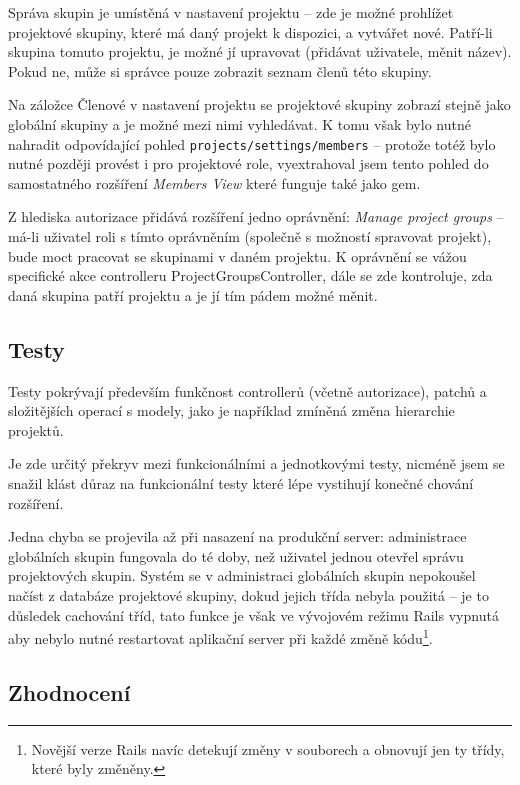 \documentclass[thesis=B,czech]{FITthesis}[2012/05/02]
\begin{document}
Správa skupin je umístěná v nastavení projektu -- zde je možné prohlížet
projektové skupiny, které má daný projekt k dispozici, a vytvářet nové.
Patří-li skupina tomuto projektu, je možné jí upravovat (přidávat
uživatele, měnit název). Pokud ne, může si správce pouze zobrazit seznam
členů této skupiny.

Na záložce Členové v nastavení projektu se projektové skupiny zobrazí
stejně jako globální skupiny a je možné mezi nimi vyhledávat. K tomu
však bylo nutné nahradit odpovídající pohled
\lstinline!projects/settings/members! -- protože totéž bylo nutné
později provést i pro projektové role, vyextrahoval jsem tento pohled do
samostatného rozšíření \emph{Members View}
které funguje také jako \gls{gem}.

Z hlediska autorizace přidává rozšíření jedno oprávnění: \emph{Manage
project groups} -- má-li uživatel roli s tímto oprávněním (společně
s možností spravovat projekt), bude moct pracovat se skupinami v daném
projektu. K oprávnění se vážou specifické akce controlleru
ProjectGroupsController, dále se zde kontroluje, zda daná skupina patří
projektu a je jí tím pádem možné měnit.

\subsection{Testy}

Testy pokrývají především funkčnost controllerů (včetně autorizace),
patchů a složitějších operací s modely, jako je například zmíněná změna
hierarchie projektů.

Je zde určitý překryv mezi funkcionálními a jednotkovými testy, nicméně
jsem se snažil klást důraz na funkcionální testy které lépe vystihují
konečné chování rozšíření.

Jedna chyba se projevila až při nasazení na produkční server:
administrace globálních skupin fungovala do té doby, než uživatel jednou
otevřel správu projektových skupin. Systém se v administraci globálních
skupin nepokoušel načíst z databáze projektové skupiny, dokud jejich
třída nebyla použitá -- je to důsledek cachování tříd, tato funkce je
však ve vývojovém režimu Rails vypnutá aby nebylo nutné restartovat
aplikační server při každé změně kódu\footnote{Novější verze Rails navíc
  detekují změny v souborech a obnovují jen ty třídy, které byly
  změněny.}.

\subsection{Zhodnocení}
\end{document}
